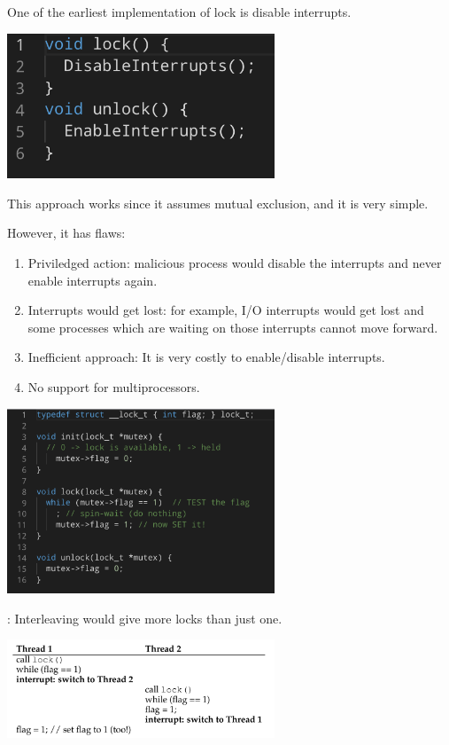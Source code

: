 
    One of the earliest implementation of lock is disable interrupts.

    \includegraphics[width=0.6\textwidth]{chapters/Cucurrency/Cucurrency/earliest_lock.png}

    This approach works since it assumes mutual exclusion, and it is very simple.

    However, it has flaws:
    \begin{enumerate}
        \item Priviledged action: malicious process would disable the interrupts and
        never enable interrupts again.
        \item Interrupts would get lost: for example, I/O interrupts would get lost 
        and some processes which are waiting on those interrupts cannot move forward.
        \item Inefficient approach: It is very costly to enable/disable interrupts.
        \item No support for multiprocessors.
    \end{enumerate}


    \includegraphics[width=0.6\textwidth]{chapters/Cucurrency/Cucurrency/lock_by_flag.png}

    : Interleaving would give more locks than just one.

    \includegraphics[width=0.6\textwidth]{chapters/Cucurrency/Cucurrency/Interleaving_problem.png}

